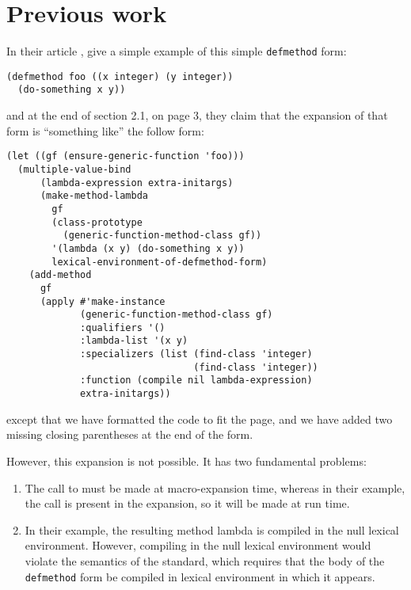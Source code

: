 \section{Previous work}

In their article \cite{Constanza:2008}, \cnh{} give a
simple example of this simple \texttt{defmethod} form:

\begin{verbatim}
(defmethod foo ((x integer) (y integer))
  (do-something x y))
\end{verbatim}

\noindent
and at the end of section 2.1, on page 3, they claim that the
expansion of that form is ``something like'' the follow form:

{\small\begin{verbatim}
(let ((gf (ensure-generic-function 'foo)))
  (multiple-value-bind
      (lambda-expression extra-initargs)
      (make-method-lambda
        gf
        (class-prototype
          (generic-function-method-class gf))
        '(lambda (x y) (do-something x y))
        lexical-environment-of-defmethod-form)
    (add-method
      gf
      (apply #'make-instance
             (generic-function-method-class gf)
             :qualifiers '()
             :lambda-list '(x y)
             :specializers (list (find-class 'integer)
                                 (find-class 'integer))
             :function (compile nil lambda-expression)
             extra-initargs))
\end{verbatim}}

\noindent
except that we have formatted the code to fit the page, and we have
added two missing closing parentheses at the end of the form.

However, this expansion is not possible.  It has two fundamental
problems:

\begin{enumerate}
\item The call to \mml{} must be made at macro-expansion time, whereas
  in their example, the call is present in the expansion, so it will
  be made at run time.
\item In their example, the resulting method lambda is compiled in the
  null lexical environment.  However, compiling in the null lexical
  environment would violate the semantics of the \commonlisp{}
  standard, which requires that the body of the \texttt{defmethod}
  form be compiled in lexical environment in which it appears.
\end{enumerate}

